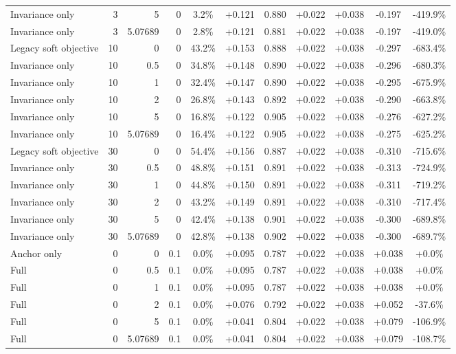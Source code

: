 \begin{table}[htbp]
\begin{tabular}{lrrrccccccc}
Invariance only & 3 & 5 & 0 & 3.2\% & +0.121 & 0.880 & +0.022 & +0.038 & -0.197 & -419.9\% \\
Invariance only & 3 & 5.07689 & 0 & 2.8\% & +0.121 & 0.881 & +0.022 & +0.038 & -0.197 & -419.0\% \\
Legacy soft objective & 10 & 0 & 0 & 43.2\% & +0.153 & 0.888 & +0.022 & +0.038 & -0.297 & -683.4\% \\
Invariance only & 10 & 0.5 & 0 & 34.8\% & +0.148 & 0.890 & +0.022 & +0.038 & -0.296 & -680.3\% \\
Invariance only & 10 & 1 & 0 & 32.4\% & +0.147 & 0.890 & +0.022 & +0.038 & -0.295 & -675.9\% \\
Invariance only & 10 & 2 & 0 & 26.8\% & +0.143 & 0.892 & +0.022 & +0.038 & -0.290 & -663.8\% \\
Invariance only & 10 & 5 & 0 & 16.8\% & +0.122 & 0.905 & +0.022 & +0.038 & -0.276 & -627.2\% \\
Invariance only & 10 & 5.07689 & 0 & 16.4\% & +0.122 & 0.905 & +0.022 & +0.038 & -0.275 & -625.2\% \\
Legacy soft objective & 30 & 0 & 0 & 54.4\% & +0.156 & 0.887 & +0.022 & +0.038 & -0.310 & -715.6\% \\
Invariance only & 30 & 0.5 & 0 & 48.8\% & +0.151 & 0.891 & +0.022 & +0.038 & -0.313 & -724.9\% \\
Invariance only & 30 & 1 & 0 & 44.8\% & +0.150 & 0.891 & +0.022 & +0.038 & -0.311 & -719.2\% \\
Invariance only & 30 & 2 & 0 & 43.2\% & +0.149 & 0.891 & +0.022 & +0.038 & -0.310 & -717.4\% \\
Invariance only & 30 & 5 & 0 & 42.4\% & +0.138 & 0.901 & +0.022 & +0.038 & -0.300 & -689.8\% \\
Invariance only & 30 & 5.07689 & 0 & 42.8\% & +0.138 & 0.902 & +0.022 & +0.038 & -0.300 & -689.7\% \\
Anchor only & 0 & 0 & 0.1 & 0.0\% & +0.095 & 0.787 & +0.022 & +0.038 & +0.038 & +0.0\% \\
Full & 0 & 0.5 & 0.1 & 0.0\% & +0.095 & 0.787 & +0.022 & +0.038 & +0.038 & +0.0\% \\
Full & 0 & 1 & 0.1 & 0.0\% & +0.095 & 0.787 & +0.022 & +0.038 & +0.038 & +0.0\% \\
Full & 0 & 2 & 0.1 & 0.0\% & +0.076 & 0.792 & +0.022 & +0.038 & +0.052 & -37.6\% \\
Full & 0 & 5 & 0.1 & 0.0\% & +0.041 & 0.804 & +0.022 & +0.038 & +0.079 & -106.9\% \\
Full & 0 & 5.07689 & 0.1 & 0.0\% & +0.041 & 0.804 & +0.022 & +0.038 & +0.079 & -108.7\% \\

\end{tabular}
\end{table}
